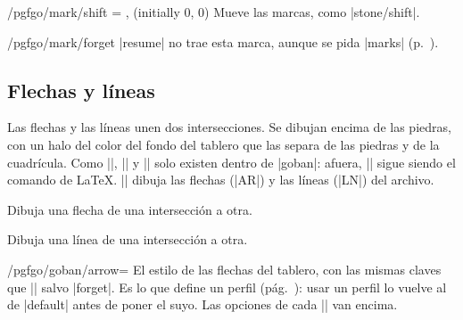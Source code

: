 \begin{key}{/pgfgo/mark/shift = ,  (initially 0, 0)}
	Mueve las marcas, como |stone/shift|.
\end{key}

\begin{key}{/pgfgo/mark/forget}
	|resume| no trae esta marca, aunque se pida |marks| (p.~\pageref{subsec:recordar}).
\end{key}


\subsection{Flechas y líneas}
\label{subsec:flechas}

Las flechas y las líneas unen dos intersecciones. Se dibujan encima de las piedras, con un halo del color del fondo del tablero que las separa de las piedras y de la cuadrícula. Como |\mark|, |\arrow| y |\line| solo existen dentro de |goban|: afuera, |\line| sigue siendo el comando de \LaTeX. |\sgf| dibuja las flechas (|AR|) y las líneas (|LN|) del archivo.

\begin{command}{\arrow{}}
	Dibuja una flecha de una intersección a otra.

	\begin{codeexample}[]
		\begin{goban}[9]
		\end{goban}
	\end{codeexample}
\end{command}

\begin{command}{\line{}}
	Dibuja una línea de una intersección a otra.

	\begin{codeexample}[]
		\begin{goban}[9]
		\end{goban}
	\end{codeexample}
\end{command}

\begin{key}{/pgfgo/goban/arrow=}
	El estilo de las flechas del tablero, con las mismas claves que |\arrow| salvo |forget|. Es lo que define un perfil (pág.~\pageref{subsec:perfiles}): usar un perfil lo vuelve al de |default| antes de poner el suyo. Las opciones de cada |\arrow| van encima.

	\begin{codeexample}[]
		\begin{goban}[9, arrow = {color = red!80!black, width = 0.6pt}]
		\end{goban}
	\end{codeexample}
\end{key}

